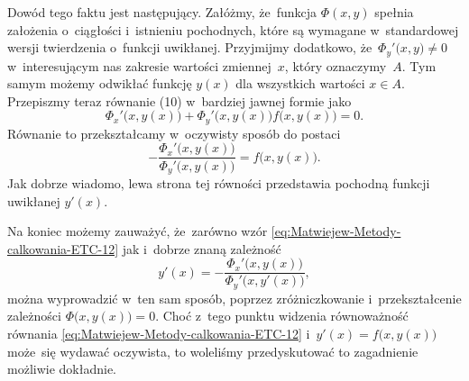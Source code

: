 \documentclass[a4paper,11pt]{article}
\begin{document}
Dowód tego faktu jest następujący. Załóżmy, że~funkcja $\Phi( x, y )$ spełnia
założenia o~ciągłości i~istnieniu pochodnych, które są wymagane
w~standardowej wersji twierdzenia o~funkcji uwikłanej. Przyjmijmy dodatkowo,
że~$\Phi_{ y }'\big( x, y \big) \neq 0$ w~interesującym nas zakresie wartości
zmiennej~$x$, który oznaczymy~$A$. Tym samym możemy odwikłać funkcję
$y( x )$ dla wszystkich wartości $x \in A$. Przepiszmy teraz równanie (10)
w~bardziej jawnej formie jako
\begin{equation}
  \label{eq:Matwiejew-Metody-calkowania-ETC-12}
  \Phi_{ x }'\big( x, y( x ) \big) +
  \Phi_{ y }'\big( x, y( x ) \big) f\big( x, y( x ) \big) = 0.
\end{equation}
Równanie to przekształcamy w~oczywisty sposób do postaci
\begin{equation}
  \label{eq:Matwiejew-Metody-calkowania-ETC-13}
  -\frac{ \Phi_{ x }'\big( x, y( x ) \big) }
  { \Phi_{ y }'\big( x, y( x ) \big) } =
  f\big( x, y( x ) \big).
\end{equation}
Jak dobrze wiadomo, lewa strona tej równości przedstawia pochodną funkcji
uwikłanej $y'( x )$.

Na koniec możemy zauważyć, że~zarówno wzór
\eqref{eq:Matwiejew-Metody-calkowania-ETC-12} jak i~dobrze znaną zależność
\begin{equation}
  \label{eq:Matwiejew-Metody-calkowania-ETC-14}
  y'( x ) =
  -\frac{ \Phi_{ x }'\big( x, y( x ) \big) }{ \Phi_{ y }'\big( x, y'( x ) \big) },
\end{equation}
można wyprowadzić w~ten sam sposób, poprzez zróżniczkowanie
i~przekształcenie zależności $\Phi\big( x, y( x ) \big) = 0$. Choć z~tego
punktu widzenia równoważność równania
\eqref{eq:Matwiejew-Metody-calkowania-ETC-12}
i~$y'( x ) = f\big( x, y( x ) \big)$ może~się wydawać oczywista, to woleliśmy
przedyskutować to zagadnienie możliwie dokładnie.

\vspace{\VerSpaceFour}





\noindent
{}  \\

\vspace{\VerSpaceFour}





\noindent
{}




\newpage
\end{document}
